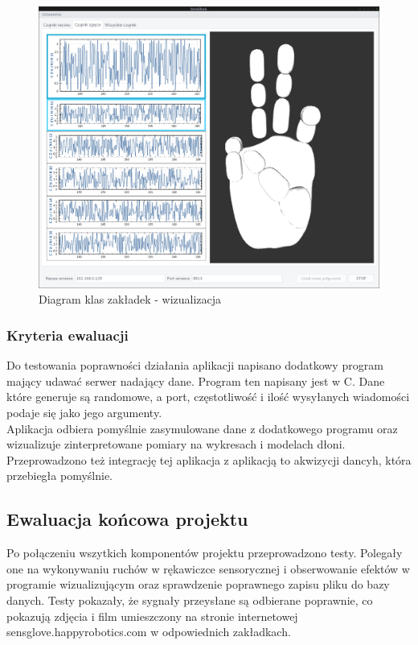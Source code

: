 \documentclass{article}
\begin{document}
\begin{figure}[H]
    \centering
    \includegraphics[width=18cm]{zakladka2.png}
    \caption{Diagram klas zakładek - wizualizacja}
    \label{rys:zakladka2}
\end{figure}

\subsubsection{Kryteria ewaluacji}
Do testowania poprawności działania aplikacji napisano dodatkowy program mający udawać serwer nadający dane. Program ten napisany jest w C. Dane które generuje są randomowe, a port, częstotliwość i ilość wysyłanych wiadomości podaje się jako jego argumenty.\\
Aplikacja odbiera pomyślnie zasymulowane dane z dodatkowego programu oraz wizualizuje zinterpretowane pomiary na wykresach i modelach dłoni. Przeprowadzono też integrację tej aplikacja z aplikacją to akwizycji dancyh, która przebiegła pomyślnie.

\subsection{Ewaluacja końcowa projektu}
Po połączeniu wszytkich komponentów projektu przeprowadzono testy. Polegały one na wykonywaniu ruchów w rękawiczce sensorycznej i obserwowanie efektów w programie wizualizującym oraz sprawdzenie poprawnego zapisu pliku do bazy danych. Testy pokazały, że sygnały przeysłane są odbierane poprawnie, co pokazują zdjęcia i film umieszczony na stronie internetowej sensglove.happyrobotics.com w odpowiednich zakładkach.
\end{document}
